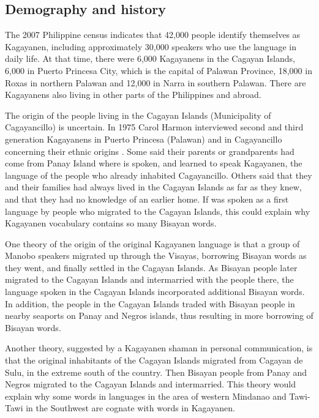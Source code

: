 \subsection{Demography and history}\label{sec:1.2.2} \label{sec:demographyandhistory}

The 2007 Philippine census indicates that 42,000 people identify themselves as Kagayanen, including approximately 30,000 speakers who use the language in daily life. At that time, there were 6,000 Kagayanens in the Cagayan Islands, 6,000 in Puerto Princesa City, which is the capital of Palawan Province, 18,000 in Roxas in northern Palawan and 12,000 in Narra in southern Palawan. There are Kagayanens also living in other parts of the Philippines and abroad.

The origin of the people living in the Cagayan Islands (Municipality of Cagayancillo) is uncertain. In 1975 Carol Harmon interviewed second and third generation Kagayanens in Puerto Princesa (Palawan) and in Cagayancillo concerning their ethnic origins \citep[4--5]{harmon1977}. Some said their parents or grandparents had come from Panay Island where  is spoken, and learned to speak Kagayanen, the language of the people who already inhabited Cagayancillo. Others said that they and their families had always lived in the Cagayan Islands as far as they knew, and that they had no knowledge of an earlier home. If  was spoken as a first language by people who migrated to the Cagayan Islands, this could explain why Kagayanen vocabulary contains so many Bisayan words.

One theory of the origin of the original Kagayanen language is that a group of Manobo speakers migrated up through the Visayas, borrowing Bisayan words as they went, and finally settled in the Cagayan Islands. As Bisayan people later migrated to the Cagayan Islands and intermarried with the people there, the language spoken in the Cagayan Islands incorporated additional Bisayan words. In addition, the people in the Cagayan Islands traded with Bisayan people in nearby seaports on Panay and Negros islands, thus resulting in more borrowing of Bisayan words.

Another theory, suggested by a Kagayanen shaman in personal communication, is that the original inhabitants of the Cagayan Islands migrated from Cagayan de Sulu, in the extreme south of the country. Then Bisayan people from Panay and Negros migrated to the Cagayan Islands and intermarried. This theory would explain why some words in languages in the area of western Mindanao and Tawi-Tawi in the Southwest are cognate with words in Kagayanen.

